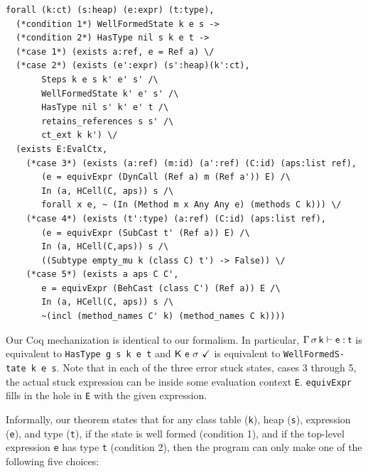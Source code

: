 \documentclass{tex/llncs}
\begin{document}
\begin{lstlisting}[basicstyle=\ttfamily\footnotesize, language={}, 
morekeywords={forall, exists}, keywordstyle={\ttfamily\color{blue!80}}, escapeinside={}]
forall (k:ct) (s:heap) (e:expr) (t:type),
  (*condition 1*) WellFormedState k e s -> 
  (*condition 2*) HasType nil s k e t -> 
  (*case 1*) (exists a:ref, e = Ref a) \/
  (*case 2*) (exists (e':expr) (s':heap)(k':ct), 
       Steps k e s k' e' s' /\
       WellFormedState k' e' s' /\
       HasType nil s' k' e' t /\
       retains_references s s' /\
       ct_ext k k') \/
  (exists E:EvalCtx,
    (*case 3*) (exists (a:ref) (m:id) (a':ref) (C:id) (aps:list ref),
       (e = equivExpr (DynCall (Ref a) m (Ref a')) E) /\
       In (a, HCell(C, aps)) s /\
       forall x e, ~ (In (Method m x Any Any e) (methods C k))) \/
    (*case 4*) (exists (t':type) (a:ref) (C:id) (aps:list ref),
       (e = equivExpr (SubCast t' (Ref a)) E) /\
       In (a, HCell(C,aps)) s /\
       ((Subtype empty_mu k (class C) t') -> False)) \/
    (*case 5*) (exists a aps C C', 
       e = equivExpr (BehCast (class C') (Ref a)) E /\
       In (a, HCell(C, aps)) s /\
       ~(incl (method_names C' k) (method_names C k))))
\end{lstlisting}

Our Coq mechanization is identical to our formalism. In particular,
$\EnvType\Env\s\k\e\t$ is equivalent to \verb|HasType g s k e t| and
$\WFq{\K~\e~\s}$ is equivalent to \verb|WellFormedS-| \verb|tate k e s|. Note that in
each of the three error stuck states, cases 3 through 5, the actual stuck
expression can be inside some evaluation context \verb|E|. \verb|equivExpr|
fills in the hole in \verb|E| with the given expression.

Informally, our theorem states that for any class table (\verb|k|), heap
(\verb|s|), expression (\verb|e|), and type (\verb|t|), if the state is well
formed (condition 1), and if the top-level expression \verb|e| has type
\verb|t| (condition 2), then the program can only make one of the following
five choices:
\end{document}
